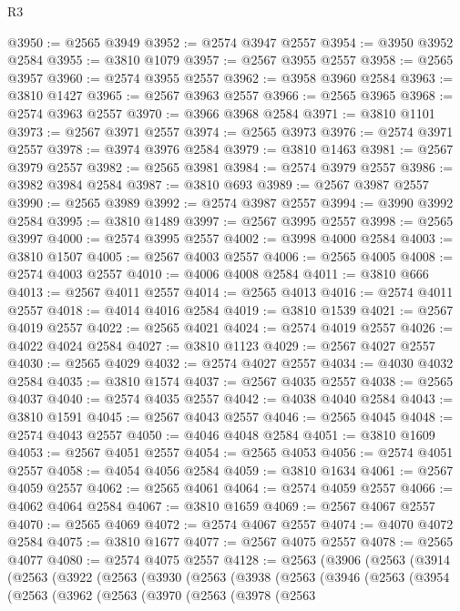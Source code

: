\begin{lexlean}{R3}
\begin{coremodule}
@3950 := @2565 @3949
@3952 := @2574 @3947 @2557
@3954 := @3950 @3952 @2584
@3955 := @3810 @1079
@3957 := @2567 @3955 @2557
@3958 := @2565 @3957
@3960 := @2574 @3955 @2557
@3962 := @3958 @3960 @2584
@3963 := @3810 @1427
@3965 := @2567 @3963 @2557
@3966 := @2565 @3965
@3968 := @2574 @3963 @2557
@3970 := @3966 @3968 @2584
@3971 := @3810 @1101
@3973 := @2567 @3971 @2557
@3974 := @2565 @3973
@3976 := @2574 @3971 @2557
@3978 := @3974 @3976 @2584
@3979 := @3810 @1463
@3981 := @2567 @3979 @2557
@3982 := @2565 @3981
@3984 := @2574 @3979 @2557
@3986 := @3982 @3984 @2584
@3987 := @3810 @693
@3989 := @2567 @3987 @2557
@3990 := @2565 @3989
@3992 := @2574 @3987 @2557
@3994 := @3990 @3992 @2584
@3995 := @3810 @1489
@3997 := @2567 @3995 @2557
@3998 := @2565 @3997
@4000 := @2574 @3995 @2557
@4002 := @3998 @4000 @2584
@4003 := @3810 @1507
@4005 := @2567 @4003 @2557
@4006 := @2565 @4005
@4008 := @2574 @4003 @2557
@4010 := @4006 @4008 @2584
@4011 := @3810 @666
@4013 := @2567 @4011 @2557
@4014 := @2565 @4013
@4016 := @2574 @4011 @2557
@4018 := @4014 @4016 @2584
@4019 := @3810 @1539
@4021 := @2567 @4019 @2557
@4022 := @2565 @4021
@4024 := @2574 @4019 @2557
@4026 := @4022 @4024 @2584
@4027 := @3810 @1123
@4029 := @2567 @4027 @2557
@4030 := @2565 @4029
@4032 := @2574 @4027 @2557
@4034 := @4030 @4032 @2584
@4035 := @3810 @1574
@4037 := @2567 @4035 @2557
@4038 := @2565 @4037
@4040 := @2574 @4035 @2557
@4042 := @4038 @4040 @2584
@4043 := @3810 @1591
@4045 := @2567 @4043 @2557
@4046 := @2565 @4045
@4048 := @2574 @4043 @2557
@4050 := @4046 @4048 @2584
@4051 := @3810 @1609
@4053 := @2567 @4051 @2557
@4054 := @2565 @4053
@4056 := @2574 @4051 @2557
@4058 := @4054 @4056 @2584
@4059 := @3810 @1634
@4061 := @2567 @4059 @2557
@4062 := @2565 @4061
@4064 := @2574 @4059 @2557
@4066 := @4062 @4064 @2584
@4067 := @3810 @1659
@4069 := @2567 @4067 @2557
@4070 := @2565 @4069
@4072 := @2574 @4067 @2557
@4074 := @4070 @4072 @2584
@4075 := @3810 @1677
@4077 := @2567 @4075 @2557
@4078 := @2565 @4077
@4080 := @2574 @4075 @2557
@4128 := @2563
    (@3906
      (@2563
        (@3914
          (@2563
            (@3922
              (@2563
                (@3930
                  (@2563
                    (@3938
                      (@2563
                        (@3946
                          (@2563
                            (@3954
                              (@2563
                                (@3962
                                  (@2563
                                    (@3970
                                      (@2563
                                        (@3978
                                          (@2563

\end{coremodule}
\end{lexlean}
